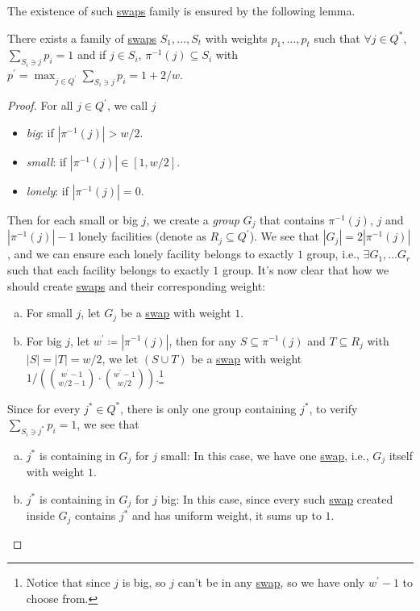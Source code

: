 The existence of such \hyperref[not:swap]{swaps} family is ensured by the following lemma.
\begin{lemma}\label{lma:lec8}
	There exists a family of \hyperref[not:swap]{swaps} \(S_1, \dots, S_t\) with weights \(p_1, \dots  , p_t\) such that \(\forall j\in Q^{\ast} \), \(\sum_{S_i \ni j}p_i = 1\) and if \(j\in S_i\), \(\pi ^{-1} (j)\subseteq S_i\) with \(p^\prime = \max _{j\in Q^\prime }\sum_{S_i\ni j}p_i = 1 + 2 / w\).
\end{lemma}
\begin{proof}
	For all \(j\in Q^\prime \), we call \(j\)
	\begin{itemize}
		\item \emph{big}: if \(\left\vert \pi ^{-1} (j) \right\vert > w / 2\).
		\item \emph{small}: if \(\left\vert \pi ^{-1} (j) \right\vert \in [1, w / 2]\).
		\item \emph{lonely}: if \(\left\vert \pi ^{-1} (j) \right\vert = 0\).
	\end{itemize}
	Then for each small or big \(j\), we create a \emph{group} \(G_j\) that contains \(\pi ^{-1} (j)\), \(j\) and \(\left\vert \pi ^{-1} (j) \right\vert - 1\) lonely facilities (denote as \(R_j \subseteq Q^\prime \)). We see that \(\left\vert G_j \right\vert = 2 \left\vert \pi ^{-1} (j) \right\vert \), and we can ensure each lonely facility belongs to exactly \(1\) group, i.e., \(\exists G_1, \dots G_r\) such that each facility belongs to exactly \(1\) group. It's now clear that how we should create \hyperref[not:swap]{swaps} and their corresponding weight:
	\begin{enumerate}[(a)]
		\item For small \(j\), let \(G_j\) be a \hyperref[not:swap]{swap} with weight \(1\).
		\item For big \(j\), let \(w^\prime \coloneqq \left\vert \pi ^{-1} (j) \right\vert \), then for any \(S \subseteq \pi ^{-1} (j)\) and \(T \subseteq R_j\) with \(\left\vert S \right\vert = \left\vert T \right\vert = w / 2\), we let \((S \cup T)\) be a \hyperref[not:swap]{swap} with weight \(1 / \left( \binom{w^\prime -1}{w / 2 - 1} \cdot \binom{w^\prime - 1}{w / 2} \right) \).\footnote{Notice that since \(j\) is big, so \(j\) can't be in any \hyperref[not:swap]{swap}, so we have only \(w^\prime - 1\) to choose from.}
	\end{enumerate}
	Since for every \(j^{\ast} \in Q^{\ast} \), there is only one group containing \(j^{\ast}\), to verify \(\sum_{S_i \ni j^{\ast} }p_i = 1 \), we see that
	\begin{enumerate}[(a)]
		\item \(j^{\ast} \) is containing in \(G_j\) for \(j\) small: In this case, we have one \hyperref[not:swap]{swap}, i.e., \(G_j\) itself with weight \(1\).
		\item \(j^{\ast} \) is containing in \(G_j\) for \(j\) big: In this case, since every such \hyperref[not:swap]{swap} created inside \(G_j\) contains \(j^{\ast} \) and has uniform weight, it sums up to \(1\).
	\end{enumerate}


\end{proof}

